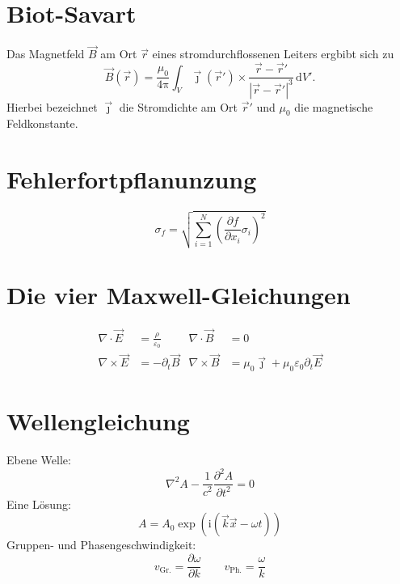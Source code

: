 \documentclass{scrartcl}
\begin{document}
\section{Biot-Savart}
Das Magnetfeld $\vec{B}$ am Ort $\vec{r}$ eines stromdurchflossenen Leiters ergbibt sich zu
\begin{equation}
  \vec{B}(\vec{r}) = \frac{\mu_0}{4\mathup{\pi}}
  \int_V \vec{\jmath}(\vec{r}') \times \frac{\vec{r}-\vec{r}'}{|\vec{r}-\vec{r}'|^3} \, \mathup{d}V' .
\end{equation}
Hierbei bezeichnet $\vec{\jmath}$ die Stromdichte am Ort $\vec{r}'$ und $\mu_0$ die magnetische Feldkonstante.

\section{Fehlerfortpflanunzung}
\begin{equation}
  \sigma_f = \sqrt{\sum\limits_{i=1}^N \left( \frac{\partial f}{\partial x_i}
                   \sigma_i \right)^{\!\!2}}
\end{equation}

\section{Die vier Maxwell-Gleichungen}
\begin{align}
  \nabla \cdot  \vec{E} &= \frac{\rho}{\varepsilon_0} &
  \nabla \cdot  \vec{B} &= 0 \\
  \nabla \times \vec{E} &= - \partial_t \vec{B} &
  \nabla \times \vec{B} &= \mu_0 \vec{\jmath} + \mu_0 \varepsilon_0 \partial_t \vec{E}
\end{align}

\section{Wellengleichung}
Ebene Welle:
\begin{equation}
  \nabla^2 A - \frac{1}{c^2} \frac{\partial^2 A}{\partial t^2} = 0
\end{equation}
Eine Lösung:
\begin{equation}
  A = A_0 \exp\left(\mathrm{i}\left(\vec{k} \vec{x} - \omega t\right)\right)
\end{equation}
Gruppen- und Phasengeschwindigkeit:
\begin{equation}
  v_\text{Gr.} = \frac{\partial \omega}{\partial k} \qquad v_\text{Ph.} = \frac{\omega}{k}
\end{equation}
\end{document}
